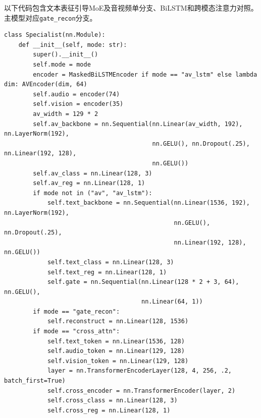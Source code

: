 以下代码包含文本表征引导MoE及音视频单分支、BiLSTM和跨模态注意力对照。
主模型对应\texttt{gate\_recon}分支。

\begin{lstlisting}
class Specialist(nn.Module):
    def __init__(self, mode: str):
        super().__init__()
        self.mode = mode
        encoder = MaskedBiLSTMEncoder if mode == "av_lstm" else lambda dim: AVEncoder(dim, 64)
        self.audio = encoder(74)
        self.vision = encoder(35)
        av_width = 129 * 2
        self.av_backbone = nn.Sequential(nn.Linear(av_width, 192), nn.LayerNorm(192),
                                         nn.GELU(), nn.Dropout(.25), nn.Linear(192, 128),
                                         nn.GELU())
        self.av_class = nn.Linear(128, 3)
        self.av_reg = nn.Linear(128, 1)
        if mode not in ("av", "av_lstm"):
            self.text_backbone = nn.Sequential(nn.Linear(1536, 192), nn.LayerNorm(192),
                                               nn.GELU(), nn.Dropout(.25),
                                               nn.Linear(192, 128), nn.GELU())
            self.text_class = nn.Linear(128, 3)
            self.text_reg = nn.Linear(128, 1)
            self.gate = nn.Sequential(nn.Linear(128 * 2 + 3, 64), nn.GELU(),
                                      nn.Linear(64, 1))
        if mode == "gate_recon":
            self.reconstruct = nn.Linear(128, 1536)
        if mode == "cross_attn":
            self.text_token = nn.Linear(1536, 128)
            self.audio_token = nn.Linear(129, 128)
            self.vision_token = nn.Linear(129, 128)
            layer = nn.TransformerEncoderLayer(128, 4, 256, .2, batch_first=True)
            self.cross_encoder = nn.TransformerEncoder(layer, 2)
            self.cross_class = nn.Linear(128, 3)
            self.cross_reg = nn.Linear(128, 1)


\end{lstlisting}
